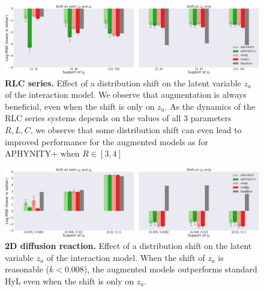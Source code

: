 \documentclass{article}
\begin{document}
\begin{figure}
    \centering
    \includegraphics[width=.98\textwidth]{figures/results_log_mse_za_OOD_RLC.png}
    \caption{\textbf{RLC series.} Effect of a distribution shift on the latent variable $z_a$ of the interaction model. We observe that augmentation is always beneficial, even when the shift is only on $z_a$. As the dynamics of the RLC series systems depends on the values of all $3$ parameters $R, L, C$, we observe that some distribution shift can even lead to improved performance for the augmented models as for APHYNITY+ when $R \in \left[3, 4\right]$}
    \label{fig:za_ood_RLC}
\end{figure}

\begin{figure}
    \centering
    \includegraphics[width=.98\textwidth]{figures/results_log_mse_za_OOD_diffusion-2.png}
    \caption{\textbf{2D diffusion reaction.} Effect of a distribution shift on the latent variable $z_a$ of the interaction model. When the shift of $z_a$ is reasonable ($k < 0.008$), the augmented models outperforms standard HyL even when the shift is only on $z_a$.}
    \label{fig:za_ood_diffusion}
\end{figure}
\end{document}
